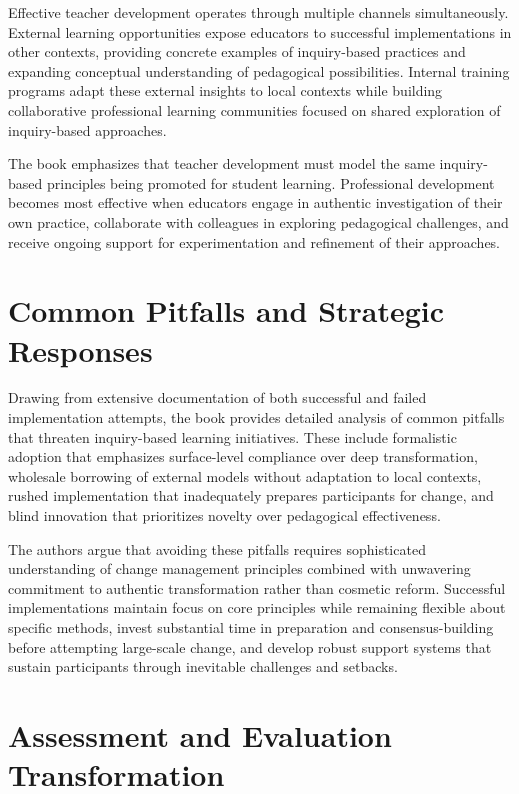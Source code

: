 \documentclass[
  Letterpaper,
]{scrbook}
\begin{document}
Effective teacher development operates through multiple channels
simultaneously. External learning opportunities expose educators to
successful implementations in other contexts, providing concrete
examples of inquiry-based practices and expanding conceptual
understanding of pedagogical possibilities. Internal training programs
adapt these external insights to local contexts while building
collaborative professional learning communities focused on shared
exploration of inquiry-based approaches.

The book emphasizes that teacher development must model the same
inquiry-based principles being promoted for student learning.
Professional development becomes most effective when educators engage in
authentic investigation of their own practice, collaborate with
colleagues in exploring pedagogical challenges, and receive ongoing
support for experimentation and refinement of their approaches.

\section{Common Pitfalls and Strategic
Responses}\label{common-pitfalls-and-strategic-responses}

Drawing from extensive documentation of both successful and failed
implementation attempts, the book provides detailed analysis of common
pitfalls that threaten inquiry-based learning initiatives. These include
formalistic adoption that emphasizes surface-level compliance over deep
transformation, wholesale borrowing of external models without
adaptation to local contexts, rushed implementation that inadequately
prepares participants for change, and blind innovation that prioritizes
novelty over pedagogical effectiveness.

The authors argue that avoiding these pitfalls requires sophisticated
understanding of change management principles combined with unwavering
commitment to authentic transformation rather than cosmetic reform.
Successful implementations maintain focus on core principles while
remaining flexible about specific methods, invest substantial time in
preparation and consensus-building before attempting large-scale change,
and develop robust support systems that sustain participants through
inevitable challenges and setbacks.

\section{Assessment and Evaluation
Transformation}\label{assessment-and-evaluation-transformation}
\end{document}
